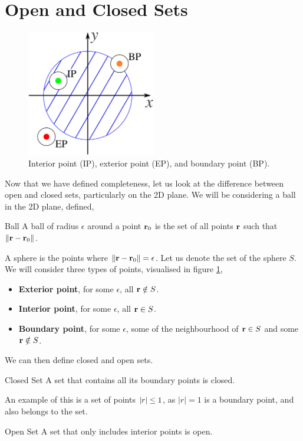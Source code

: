 \documentclass{book}
\begin{document}
\section{Open and Closed Sets}
\begin{figure}
	\centering
	\includegraphics[width=0.5\textwidth]{ball.png}
	\caption{Interior point (IP), exterior point (EP), and boundary point (BP).}
	\label{fig:ball}
\end{figure}
Now that we have defined completeness, let us look at the difference between open and closed sets, particularly on the 2D plane. We will be considering a ball in the 2D plane,
defined,
\begin{Definitions}{Ball}{}
	A ball of radius $\epsilon$ around a point $\vb{r}_0$ is the set of all points $\vb{r}$ such that $\norm{\vb{r} - \vb{r}_0}$.
\end{Definitions} 
A sphere is the points where $\norm{\vb{r} - \vb{r}_0} = \epsilon$. Let us denote the set of the sphere $S$. We will consider three types of points, visualised in figure \ref{fig:ball},
\begin{itemize}
	\item \textbf{Exterior point}, for some $\epsilon$, all  $\vb{r} \notin S$.
	\item \textbf{Interior point}, for some $\epsilon$, all $\vb{r} \in S$.
	\item \textbf{Boundary point}, for some $\epsilon$, some of the neighbourhood of $\vb{r} \in S$ and some $\vb{r} \notin S$.
\end{itemize}
We can then define closed and open sets.
\begin{Definitions}{Closed Set}{}
	A set that contains all its boundary points is closed.
\end{Definitions}
An example of this is a set of points $\abs{r} \leq 1$, as $|r| = 1$ is a boundary point, and also belongs to the set. 
\begin{Definitions}{Open Set}{}
	A set that only includes interior points is open.
\end{Definitions}
\end{document}
